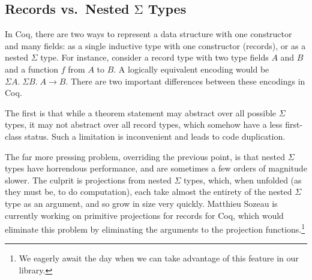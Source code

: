 \documentclass[runningheads]{llncs}
\begin{document}

  \subsection{Records vs.~Nested \texorpdfstring{$\mathrm{\Sigma}$}{Σ} Types} \label{sec:records-vs-sigma}
    In Coq, there are two ways to represent a data structure with one constructor and many fields: as a single inductive type with one constructor (records), or as a nested $\Sigma$ type.  For instance, consider a record type with two type fields $A$ and $B$ and a function $f$ from $A$ to $B$.  A logically equivalent encoding would be $\Sigma A. \; \Sigma B. \; A \to B$.  There are two important differences between these encodings in Coq.

    \label{sec:prim-record-proj}
    The first is that while a theorem statement may abstract over all possible $\Sigma$ types, it may not abstract over all record types, which somehow have a less first-class status.  Such a limitation is inconvenient and leads to code duplication.

    The far more pressing problem, overriding the previous point, is that nested $\Sigma$ types have horrendous performance, and are sometimes a few orders of magnitude slower.  The culprit is projections from nested $\Sigma$ types, which, when unfolded (as they must be, to do computation), each take almost the entirety of the nested $\Sigma$ type as an argument, and so grow in size very quickly.  Matthieu Sozeau is currently working on primitive projections for records for Coq, which would eliminate this problem by eliminating the arguments to the projection functions.\footnote{We eagerly await the day when we can take advantage of this feature in our library.}
\end{document}
